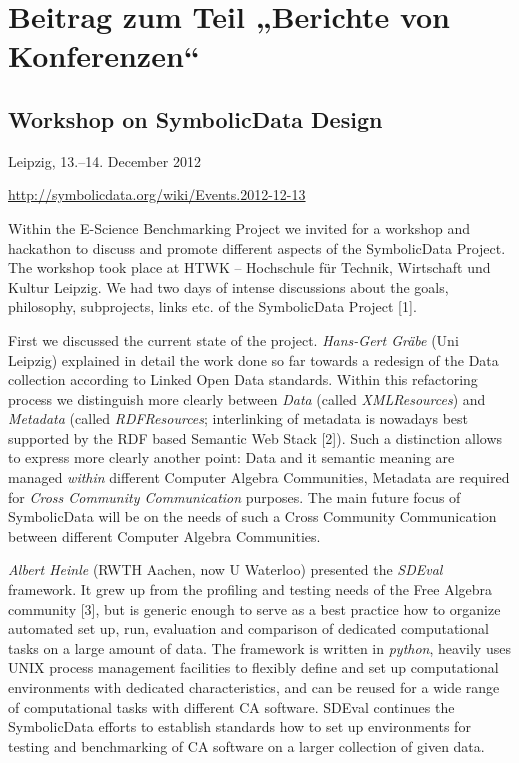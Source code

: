 \documentclass{article}
\begin{document}
\section*{\centering Beitrag zum Teil „Berichte von Konferenzen“}

\subsection*{Workshop on SymbolicData Design}

Leipzig, 13.--14. December 2012

\url{http://symbolicdata.org/wiki/Events.2012-12-13}

Within the E-Science Benchmarking Project we invited for a workshop and
hackathon to discuss and promote different aspects of the SymbolicData
Project.  The workshop took place at HTWK -- Hochschule für Technik,
Wirtschaft und Kultur Leipzig.  We had two days of intense discussions about
the goals, philosophy, subprojects, links etc. of the SymbolicData Project [1].

First we discussed the current state of the project. \emph{Hans-Gert Gräbe}
(Uni Leipzig) explained in detail the work done so far towards a redesign of
the Data collection according to Linked Open Data standards. Within this
refactoring process we distinguish more clearly between \emph{Data} (called
\emph{XMLResources}) and \emph{Metadata} (called \emph{RDFResources};
interlinking of metadata is nowadays best supported by the RDF based Semantic
Web Stack [2]). Such a distinction allows to express more clearly another
point: Data and it semantic meaning are managed \emph{within} different
Computer Algebra Communities, Metadata are required for \emph{Cross Community
  Communication} purposes. The main future focus of SymbolicData will be on
the needs of such a Cross Community Communication between different Computer
Algebra Communities.

\emph{Albert Heinle} (RWTH Aachen, now U Waterloo) presented the \emph{SDEval}
framework. It grew up from the profiling and testing needs of the Free Algebra
community [3], but is generic enough to serve as a best practice how to
organize automated set up, run, evaluation and comparison of dedicated
computational tasks on a large amount of data. The framework is written in
\emph{python}, heavily uses UNIX process management facilities to flexibly
define and set up computational environments with dedicated characteristics,
and can be reused for a wide range of computational tasks with different CA
software. SDEval continues the SymbolicData efforts to establish standards how
to set up environments for testing and benchmarking of CA software on a larger
collection of given data.
\end{document}
